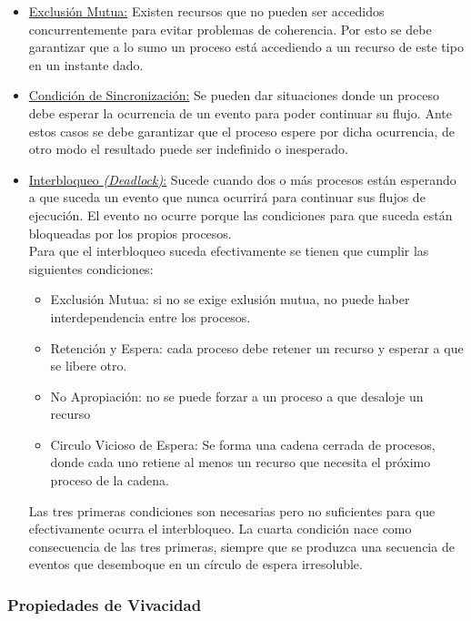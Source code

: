 \begin{itemize}
    \item \underline{Exclusión Mutua:} Existen recursos que no pueden ser
    accedidos concurrentemente para evitar problemas de coherencia. Por esto se
    debe garantizar que a lo sumo un proceso está accediendo a un recurso de este
    tipo en un instante dado.
    \item \underline{Condición de Sincronización:} Se pueden dar situaciones
    donde un proceso debe esperar la ocurrencia de un evento para poder
    continuar su flujo. Ante estos casos se debe garantizar que el proceso
    espere por dicha ocurrencia, de otro modo el resultado puede ser indefinido
    o inesperado.
    \item \underline{Interbloqueo \textit{(Deadlock)}:} Sucede cuando dos o más
    procesos están esperando a que suceda un evento que nunca ocurrirá para continuar sus
    flujos de ejecución. El evento no ocurre porque las condiciones para que
    suceda están bloqueadas por los propios procesos.\\
    Para que el interbloqueo suceda efectivamente se tienen que cumplir las
    siguientes condiciones:
    \begin{itemize} 
        \item Exclusión Mutua: si no se exige exlusión mutua, no puede haber
        interdependencia entre los procesos.
        \item Retención y Espera: cada proceso debe retener un recurso y esperar
        a que se libere otro.
        \item No Apropiación: no se puede forzar a un proceso a que desaloje un
        recurso
        \item Circulo Vicioso de Espera: Se forma una cadena cerrada de
        procesos, donde cada uno retiene al menos un recurso que necesita el
        próximo proceso de la cadena.
    \end{itemize}
    Las tres primeras condiciones son necesarias pero no suficientes para que
    efectivamente ocurra el interbloqueo. La cuarta condición nace como
    consecuencia de las tres primeras, siempre que se produzca una secuencia de
    eventos que desemboque en un círculo de espera irresoluble.
    \cite{SistOpStallings}
\end{itemize}

\subsubsection*{Propiedades de Vivacidad}

